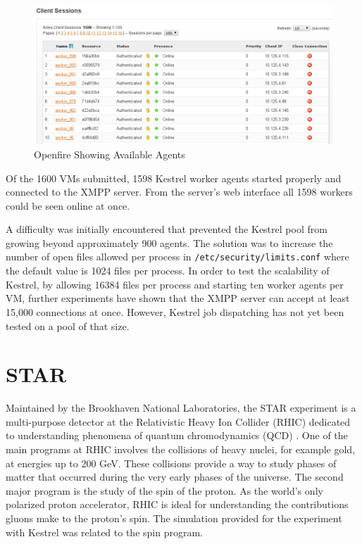 %
\begin{figure}
\includegraphics[width=1\columnwidth]{figures/Screenshot}
\caption{\label{fig:Openfire-Showing-Available}Openfire Showing Available Agents}
\end{figure}


Of the 1600 VMs submitted, 1598 Kestrel worker agents started properly
and connected to the XMPP server. From the server's web interface
all 1598 workers could be seen online at once. 

A difficulty was initially encountered that prevented the Kestrel
pool from growing beyond approximately 900 agents. The solution was
to increase the number of open files allowed per process in \texttt{/etc/security/limits.conf}
where the default value is 1024 files per process. In order to test
the scalability of Kestrel, by allowing 16384 files per process and
starting ten worker agents per VM, further experiments have shown
that the XMPP server can accept at least 15,000 connections at once.
However, Kestrel job dispatching has not yet been tested on a pool
of that size.


\section{STAR}

\label{sec:STAR} Maintained by the Brookhaven National Laboratories,
the STAR experiment is a multi-purpose detector at the Relativistic
Heavy Ion Collider (RHIC) dedicated to understanding phenomena of
quantum chromodynamics (QCD) \cite{STAR}. One of the main programs
at RHIC involves the collisions of heavy nuclei, for example gold,
at energies up to 200 GeV. These collisions provide a way to study
phases of matter that occurred during the very early phases of the
universe. The second major program is the study of the spin of the
proton. As the world's only polarized proton accelerator, RHIC is
ideal for understanding the contributions gluons make to the proton's
spin. The simulation provided for the experiment with Kestrel was
related to the spin program.


